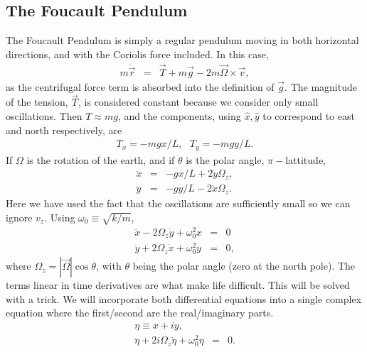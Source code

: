 \subsection{The Foucault Pendulum}
The Foucault Pendulum is simply a regular pendulum moving in both horizontal directions, and with the Coriolis force included. In this case,
\begin{eqnarray*}
m\ddot{\vec{r}}&=&\vec{T}+m\vec{g}-2m\vec{\Omega}\times\vec{v},
\end{eqnarray*}
as the centrifugal force term is absorbed into the definition of $\vec{g}$. The magnitude of the tension, $\vec{T}$, is considered constant because we consider only small oscillations. Then $T\approx mg$, and the components, using $\hat{x},\hat{y}$ to correspond to east and north respectively, are
\begin{eqnarray*}
T_x=-mgx/L,~~~T_y=-mgy/L. 
\end{eqnarray*}
If $\Omega$ is the rotation of the earth, and if $\theta$ is the polar angle, $\pi-$lattitude, 
\begin{eqnarray*}
\ddot{x}&=&-gx/L+2\dot{y}\Omega_z,\\
\ddot{y}&=&-gy/L-2\dot{x}\Omega_z.
\end{eqnarray*}
Here we have used the fact that the oscillations are sufficiently small so we can ignore $v_z$. Using $\omega_0\equiv\sqrt{k/m}$,
\begin{eqnarray*}
\ddot{x}-2\Omega_z\dot{y}+\omega_0^2x&=&0\\
\ddot{y}+2\Omega_z\dot{x}+\omega_0^2y&=&0,
\end{eqnarray*}
where $\Omega_z=|\vec{\Omega}|\cos\theta$, with $\theta$ being the polar angle (zero at the north pole). The terms linear in time derivatives are what make life difficult. This will be solved with a trick. We will incorporate both differential equations into a single complex equation where the first/second are the real/imaginary parts.
\begin{eqnarray*}
\eta\equiv x+iy,\\
\ddot{\eta}+2i\Omega_z\dot{\eta}+\omega_0^2\eta&=&0. 
\end{eqnarray*}

